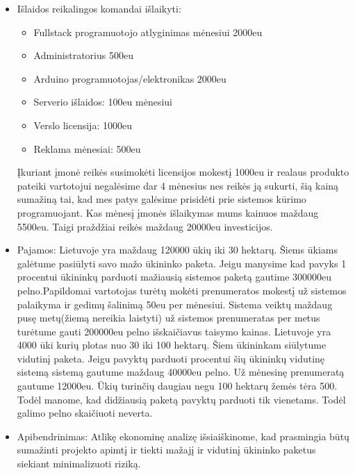 \documentclass[oneside]{VUMIFPSkursinis}
\begin{document}
\begin{itemize}
\begin{itemize}
		\end{itemize}
		\item{Išlaidos reikalingos komandai išlaikyti:}
		\begin{itemize}
			\item{Fullstack programuotojo atlyginimas mėnesiui 2000eu}
			\item{Administratorius 500eu}
			\item{Arduino programuotojas/elektronikas 2000eu}
			\item{Serverio išlaidos: 100eu mėnesiui}
			\item{Verslo licensija: 1000eu}
			\item{Reklama mėnesiai: 500eu}
		\end{itemize}
		Įkuriant įmonė reikės susimokėti licensijos mokestį 1000eu ir realaus produkto pateiki vartotojui negalėsime dar 4 mėnesius nes reikės ją sukurti, šią kainą sumažiną tai, kad mes patys galėsime prisidėti prie sistemos kūrimo programuojant. Kas mėnesį įmonės išlaikymas mums kainuos maždaug 5500eu. Taigi praždžiai reikės maždaug 20000eu investicijos. 
		\newline
	

		
		\item{Pajamos:}
Lietuvoje yra maždaug 120000 ūkių iki 30 hektarų. Šiems ūkiams galėtume pasiūlyti savo mažo ūkininko paketa. Jeigu manysime kad pavyks 1 procentui ūkininkų parduoti mažiausią sistemos paketą gautime 300000eu pelno.Papildomai vartotojas turėtų mokėti prenumeratos mokestį už sistemos palaikyma ir gedimų šalinimą 50eu per mėnesiui. Sistema veiktų maždaug pusę metų(žiemą nereikia laistyti) už sistemos prenumeratas per metus turėtume gauti 200000eu pelno išskaičiavus taisymo kainas.
		\newline
		Lietuvoje yra 4000 ūki kurių plotas nuo 30 iki 100 hektarų. Šiem ūkininkam siūlytume vidutinį paketa. Jeigu pavyktų parduoti procentui šių ūkininkų vidutinę sistemą sistemą gautume maždaug 40000eu pelno. Už mėnesinę prenumeratą gautume 12000eu.
		\newline
		Ūkių turinčių daugiau negu 100 hektarų žemės tėra 500. Todėl manome, kad didžiausią paketą pavyktų parduoti tik vienetams. Todėl galimo pelno skaičiuoti neverta.
		
		\item{Apibendrinimas:}
		\newline
		Atlikę ekonominę analizę išsiaiškinome, kad prasmingia būtų sumažinti projekto apimtį ir tiekti mažajį ir vidutinį ūkininko paketus siekiant minimalizuoti riziką.


	\end{itemize}
\end{document}
